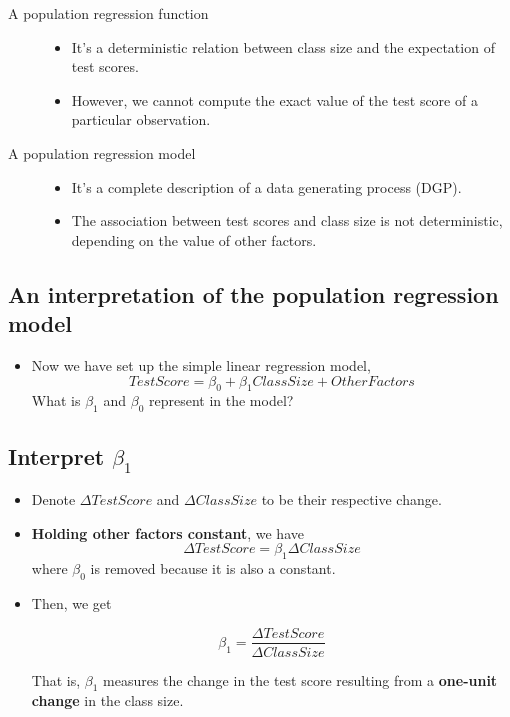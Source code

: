 \documentclass[11pt]{article}
\begin{document}
\begin{description}
\item[{A population regression function}] \begin{itemize}
\item It's a deterministic relation between class size and the expectation of
test scores.

\item However, we cannot compute the exact value of the test score of a
particular observation.
\end{itemize}

\item[{A population regression model}] \begin{itemize}
\item It's a complete description of a data generating process (DGP).
\item The association between test scores and class size is not
deterministic, depending on the value of other factors.
\end{itemize}
\end{description}

\subsection*{An interpretation of the population regression model}
\label{sec:org2f32d7a}

\begin{itemize}
\item Now we have set up the simple linear regression model,
\begin{equation*}
TestScore = \beta_0 + \beta_1 ClassSize + OtherFactors
\end{equation*}
What is \(\beta_1\) and \(\beta_0\) represent in the model?
\end{itemize}

\subsection*{Interpret \(\beta_1\)}
\label{sec:org70930d3}

\begin{itemize}
\item Denote \(\Delta TestScore\) and \(\Delta ClassSize\) to
be their respective change.

\item \textbf{Holding other factors constant}, we have
\[ \Delta TestScore = \beta_1 \Delta ClassSize  \]
where \(\beta_0\) is removed because it is also a constant.

\item Then, we get

\[ \beta_1 = \frac{\Delta TestScore}{\Delta ClassSize} \]

That is, \(\beta_1\) measures the change in the test score resulting
from a \textbf{one-unit change} in the class size.
\end{itemize}
\end{document}
